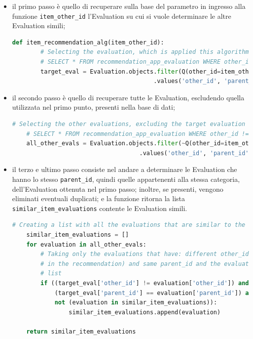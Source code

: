 \begin{itemize}
    \item il primo passo è quello di recuperare sulla base del parametro in ingresso alla funzione \texttt{item\_other\_id} 
    l'Evaluation su cui si vuole determinare le altre Evaluation simili;
    \lstset{style=python_code_style}
    \begin{lstlisting}[language=Python, label=lst:IB_CF_Evaluation_1]
    def item_recommendation_alg(item_other_id):
        # Selecting the evaluation, which is applied this algorithm, from its other_id
        # SELECT * FROM recommendation_app_evaluation WHERE other_id = %(item_other_id)s AND node_type = 'eva'
        target_eval = Evaluation.objects.filter(Q(other_id=item_other_id) & Q(node_type="eva"))\
                                        .values('other_id', 'parent_id')[0]
    \end{lstlisting} 
    \item il secondo passo è quello di recuperare tutte le Evaluation, escludendo quella utilizzata nel primo punto, presenti nella base di dati;
    \begin{lstlisting}[language=Python, label=lst:IB_CF_Evaluation_2]
    # Selecting the other evaluations, excluding the target evaluation
    # SELECT * FROM recommendation_app_evaluation WHERE other_id != %(item_other_id)s AND node_type = 'eva'
    all_other_evals = Evaluation.objects.filter(~Q(other_id=item_other_id) & Q(node_type="eva"))\
                                    .values('other_id', 'parent_id').order_by('other_id')
    \end{lstlisting}
    \item il terzo e ultimo passo consiste nel andare a determinare le Evaluation che hanno lo stesso \texttt{parent\_id}, quindi 
    quelle appartenenti alla stessa categoria, dell'Evaluation ottenuta nel primo passo; inoltre, se presenti, vengono 
    eliminati eventuali duplicati; e la funzione ritorna la lista \texttt{similar\_item\_evaluations} contente le Evaluation simili.
    \begin{lstlisting}[language=Python, label=lst:IB_CF_Evaluation_3]
    # Creating a list with all the evaluations that are similar to the target evaluation (comparing the parent_id)
    similar_item_evaluations = []
    for evaluation in all_other_evals:
        # Taking only the evaluations that have: different other_id (excluding the target evaluation
        # in the recommendation) and same parent_id and the evaluations that weren't added to similar_item_evaluations
        # list
        if ((target_eval['other_id'] != evaluation['other_id']) and
            (target_eval['parent_id'] == evaluation['parent_id']) and
            not (evaluation in similar_item_evaluations)):
                similar_item_evaluations.append(evaluation)
    
    return similar_item_evaluations 
    \end{lstlisting}
\end{itemize}
